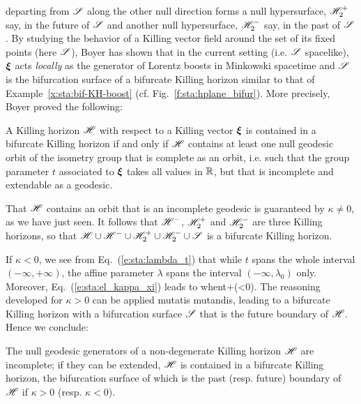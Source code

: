departing from $\mathscr{S}$ along the other null direction forms a null hypersurface,
$\mathscr{H}_2^+$ say, in the future of $\mathscr{S}$ and another null hypersurface, $\mathscr{H}_2^-$
say, in the past of $\mathscr{S}$.
By studying the behavior of a Killing vector field around the set of its
fixed points (here $\mathscr{S}$), Boyer \cite{Boyer69} has shown that in
the current setting (i.e. $\mathscr{S}$ spacelike), $\bm{\xi}$ acts \emph{locally}
as the generator of Lorentz boosts in Minkowski spacetime and $\mathscr{S}$ is the bifurcation surface
of a bifurcate Killing horizon similar to that of Example~\ref{x:sta:bif-KH-boost}
(cf. Fig.~\ref{f:sta:hplane_bifur}).
More precisely, Boyer proved the following:

\begin{prop}
\label{p:sta:Boyer_thm}
A Killing horizon $\mathscr{H}$ with respect to a Killing vector $\bm{\xi}$
is contained in a bifurcate Killing horizon if and
only if $\mathscr{H}$ contains at least one null geodesic orbit of the isometry group that is
complete as an orbit, i.e. such that the group parameter $t$ associated to $\bm{\xi}$ takes
all values in $\mathbb{R}$, but that is incomplete and extendable as
a geodesic.
\end{prop}

That $\mathscr{H}$ contains an orbit that is an incomplete geodesic is guaranteed by
$\kappa\not=0$, as we have just seen.
It follows that $\mathscr{H}^-$, $\mathscr{H}_2^+$ and $\mathscr{H}_2^-$
are three Killing horizons, so that $\mathscr{H}\cup\mathscr{H}^-\cup\mathscr{H}_2^+\cup\mathscr{H}_2^-\cup\mathscr{S}$
is a bifurcate Killing horizon.

If $\kappa<0$, we see from Eq.~(\ref{e:sta:lambda_t}) that while $t$ spans the
whole interval $(-\infty,+\infty)$, the affine parameter $\lambda$ spans the
interval $(-\infty,\lambda_0)$ only. Moreover, Eq.~(\ref{e:sta:el_kappa_xi})
leads to
\be
    \w{\xi}  \quad\mbox{when}\quad t\rightarrow +\infty  \qquad (\kappa<0).
\ee
The reasoning developed for $\kappa>0$ can be applied mutatis mutandis,
leading to a bifurcate Killing horizon with a bifurcation surface $\mathscr{S}$ that
is the future boundary of $\mathscr{H}$. Hence we conclude:
\begin{prop}
\label{p:sta:non_degen_bifurcate}
The null geodesic generators of a non-degenerate Killing horizon $\mathscr{H}$ are
incomplete; if they can be extended, $\mathscr{H}$ is contained in a
bifurcate Killing horizon, the bifurcation surface of which is the past
(resp. future) boundary of $\mathscr{H}$ if $\kappa>0$ (resp. $\kappa<0$).
\end{prop}

